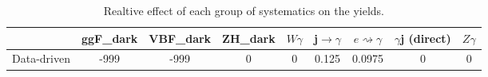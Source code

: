 \documentclass[10pt]{article}
\begin{document}
\begin{table}[htbp]
\begin{center}
\begin{tabular}{|c|c|c|c|c|c|c|c|c|}
\hline 
      & ggF_{dark}      & VBF_{dark}      & ZH_{dark}      & $W\gamma$      & j$\rightarrow\gamma$      & $e\rightsquigarrow\gamma$      & $\gamma$j (direct)      & $Z\gamma$ \\ 
\hline 
 Data-driven & -999 & -999 & 0 & 0 & 0.125 & 0.0975 & 0 & 0 \\ 
\hline 
\end{tabular} 
\caption{Realtive effect of each group of systematics on the yields.} 
\end{center} 
\end{table} 
\end{document}
